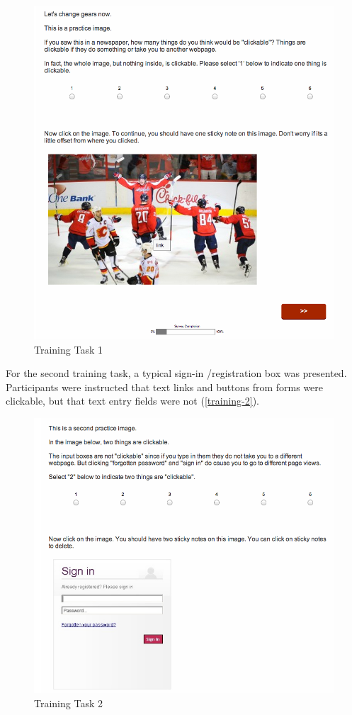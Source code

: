 \begin{figure}
\centerline{
\includegraphics[scale=.3]{chapter6.tex/training1}
}
\caption{Training Task 1}
\label{training-1}
\end{figure}


For the second training task, a typical sign-in \slash  registration box was presented. Participants were instructed that text links and buttons from forms were clickable, but that text entry fields were not  (\autoref{training-2}). 


\begin{figure}
\centerline{
\includegraphics[scale=.3]{chapter6.tex/training2}
}
\caption{Training Task 2}
\label{training-2}
\end{figure}


